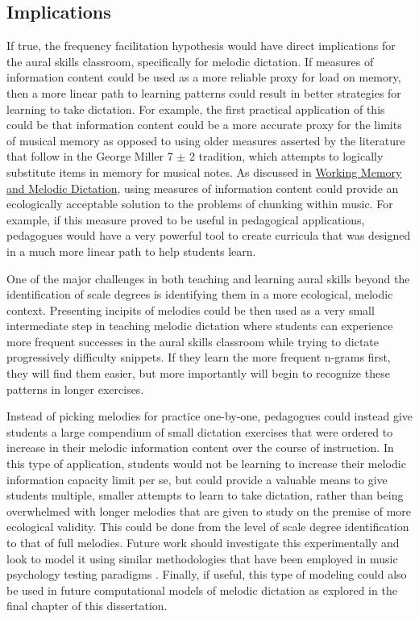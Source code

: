 \documentclass[12pt,]{book}
\begin{document}
\hypertarget{implications}{%
\subsection{Implications}\label{implications}}

If true, the frequency facilitation hypothesis would have direct implications for the aural skills classroom, specifically for melodic dictation.
If measures of information content could be used as a more reliable proxy for load on memory, then a more linear path to learning patterns could result in better strategies for learning to take dictation.
For example, the first practical application of this could be that information content could be a more accurate proxy for the limits of musical memory as opposed to using older measures asserted by the literature that follow in the George Miller 7 \(\pm\) 2 tradition, which attempts to logically substitute items in memory for musical notes.
As discussed in \protect\hyperlink{working-memory-and-melodic-dictation}{Working Memory and Melodic Dictation}, using measures of information content could provide an ecologically acceptable solution to the problems of chunking within music.
For example, if this measure proved to be useful in pedagogical applications, pedagogues would have a very powerful tool to create curricula that was designed in a much more linear path to help students learn.

One of the major challenges in both teaching and learning aural skills beyond the identification of scale degrees is identifying them in a more ecological, melodic context.
Presenting incipits of melodies could be then used as a very small intermediate step in teaching melodic dictation where students can experience more frequent successes in the aural skills classroom while trying to dictate progressively difficulty snippets.
If they learn the more frequent n-grams first, they will find them easier, but more importantly will begin to recognize these patterns in longer exercises.

Instead of picking melodies for practice one-by-one, pedagogues could instead give students a large compendium of small dictation exercises that were ordered to increase in their melodic information content over the course of instruction.
In this type of application, students would not be learning to increase their melodic information capacity limit per se, but could provide a valuable means to give students multiple, smaller attempts to learn to take dictation, rather than being overwhelmed with longer melodies that are given to study on the premise of more ecological validity.
This could be done from the level of scale degree identification to that of full melodies.
Future work should investigate this experimentally and look to model it using similar methodologies that have been employed in music psychology testing paradigms \citep{harrisonApplyingModernPsychometric2017a, wolfGradesReflectDevelopment2014}.
Finally, if useful, this type of modeling could also be used in future computational models of melodic dictation as explored in the final chapter of this dissertation.
\end{document}
